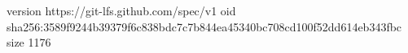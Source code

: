 version https://git-lfs.github.com/spec/v1
oid sha256:3589f9244b39379f6c838bdc7c7b844ea45340bc708cd100f52dd614eb343fbc
size 1176
